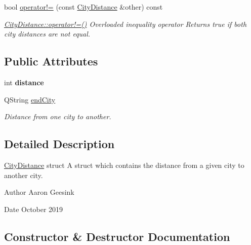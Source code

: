 \begin{DoxyCompactItemize}
\mbox{\label{struct_city_distance_ae56feb19d11926e9d3bc03b5abfc9b48}} 
bool \mbox{\hyperlink{struct_city_distance_ae56feb19d11926e9d3bc03b5abfc9b48}{operator!=}} (const \mbox{\hyperlink{struct_city_distance}{City\+Distance}} \&other) const
\begin{DoxyCompactList}\small\item\em \mbox{\hyperlink{struct_city_distance_ae56feb19d11926e9d3bc03b5abfc9b48}{City\+Distance\+::operator!=()}} Overloaded inequality operator Returns true if both city distances are not equal. \end{DoxyCompactList}\end{DoxyCompactItemize}
\subsection*{Public Attributes}
\begin{DoxyCompactItemize}
\item 
\mbox{\label{struct_city_distance_aabe1e1bba711dab73cd70f1105c35c9e}} 
int {\bfseries distance}
\item 
\mbox{\label{struct_city_distance_a7f1fe8d0c76af2abf5bc5c6bd1800e7f}} 
Q\+String \mbox{\hyperlink{struct_city_distance_a7f1fe8d0c76af2abf5bc5c6bd1800e7f}{end\+City}}
\begin{DoxyCompactList}\small\item\em Distance from one city to another. \end{DoxyCompactList}\end{DoxyCompactItemize}


\subsection{Detailed Description}
\mbox{\hyperlink{struct_city_distance}{City\+Distance}} struct A struct which contains the distance from a given city to another city. 

\begin{DoxyAuthor}{Author}
Aaron Geesink 
\end{DoxyAuthor}
\begin{DoxyDate}{Date}
October 2019 
\end{DoxyDate}


\subsection{Constructor \& Destructor Documentation}
\mbox{\label{struct_city_distance_aa486f287fb876e7aec9d41340a9a2b62}} 
